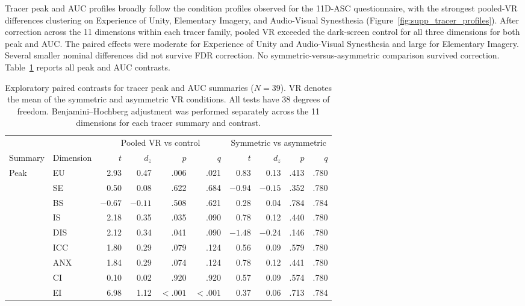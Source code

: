 \documentclass[pdflatex,sn-basic,lineno]{../sn-jnl}
\begin{document}
Tracer peak and AUC profiles broadly follow the condition profiles observed for the 11D-ASC questionnaire, with the strongest pooled-VR differences clustering on Experience of Unity, Elementary Imagery, and Audio-Visual Synesthesia (Figure~\ref{fig:supp_tracer_profiles}). After correction across the 11 dimensions within each tracer family, pooled VR exceeded the dark-screen control for all three dimensions for both peak and AUC. The paired effects were moderate for Experience of Unity and Audio-Visual Synesthesia and large for Elementary Imagery. Several smaller nominal differences did not survive FDR correction. No symmetric-versus-asymmetric comparison survived correction. Table~\ref{tab:supp_tracer_condition_contrasts} reports all peak and AUC contrasts.

\begin{table}[!htbp]
\centering
\scriptsize
\setlength{\tabcolsep}{2.2pt}
\caption{Exploratory paired contrasts for tracer peak and AUC summaries ($N=39$). VR denotes the mean of the symmetric and asymmetric VR conditions. All tests have 38 degrees of freedom. Benjamini--Hochberg adjustment was performed separately across the 11 dimensions for each tracer summary and contrast.}
\label{tab:supp_tracer_condition_contrasts}
\begin{tabular*}{\textwidth}{@{\extracolsep{\fill}}llrrrrrrrr@{}}
\toprule
& & \multicolumn{4}{c}{Pooled VR vs control} & \multicolumn{4}{c}{Symmetric vs asymmetric} \\
\cmidrule(lr){3-6}\cmidrule(lr){7-10}
Summary & Dimension & $t$ & $d_z$ & $p$ & $q$ & $t$ & $d_z$ & $p$ & $q$ \\
\midrule
Peak & EU  & 2.93 & 0.47 & .006 & .021 &  0.83 &  0.13 & .413 & .780 \\
     & SE  & 0.50 & 0.08 & .622 & .684 & $-0.94$ & $-0.15$ & .352 & .780 \\
     & BS  & $-0.67$ & $-0.11$ & .508 & .621 & 0.28 & 0.04 & .784 & .784 \\
     & IS  & 2.18 & 0.35 & .035 & .090 & 0.78 & 0.12 & .440 & .780 \\
     & DIS & 2.12 & 0.34 & .041 & .090 & $-1.48$ & $-0.24$ & .146 & .780 \\
     & ICC & 1.80 & 0.29 & .079 & .124 & 0.56 & 0.09 & .579 & .780 \\
     & ANX & 1.84 & 0.29 & .074 & .124 & 0.78 & 0.12 & .441 & .780 \\
     & CI  & 0.10 & 0.02 & .920 & .920 & 0.57 & 0.09 & .574 & .780 \\
     & EI  & 6.98 & 1.12 & $<.001$ & $<.001$ & 0.37 & 0.06 & .713 & .784 \\

\end{tabular*}
\end{table}
\end{document}

